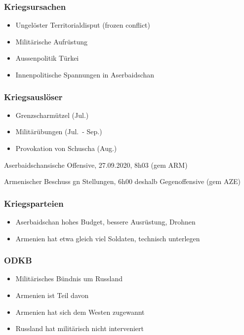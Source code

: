 {}\documentclass[a4paper]{article}
\providecommand{\tightlist}{\setlength{\itemsep}{1mm}\setlength{\parskip}{1mm}}
\begin{document}
\subsubsection{Kriegsursachen}\label{kriegsursachen}

\begin{itemize}
	\tightlist
	\item
	      Ungelöster Territorialdisput (frozen conflict)
	\item
	      Militärische Aufrüstung
	\item
	      Aussenpolitik Türkei
	\item
	      Innenpolitische Spannungen in Aserbaidschan
\end{itemize}

\subsubsection{Kriegsauslöser}\label{kriegsausluxf6ser}

\begin{itemize}
	\tightlist
	\item
	      Grenzscharmützel (Jul.)
	\item
	      Militärübungen (Jul.~- Sep.)
	\item
	      Provokation von Schuscha (Aug.)
\end{itemize}

Aserbaidschansische Offensive, 27.09.2020, 8h03 (gem ARM)

Armenischer Beschuss gn Stellungen, 6h00 deshalb Gegenoffensive (gem
AZE)

\subsubsection{Kriegsparteien}\label{kriegsparteien}

\begin{itemize}
	\tightlist
	\item
	      Aserbaidschan hohes Budget, bessere Ausrüstung, Drohnen
	\item
	      Armenien hat etwa gleich viel Soldaten, technisch unterlegen
\end{itemize}

\subsubsection{ODKB}\label{odkb}

\begin{itemize}
	\tightlist
	\item
	      Militärisches Bündnis um Russland
	\item
	      Armenien ist Teil davon
	\item
	      Armenien hat sich dem Westen zugewannt
	\item
	      Russland hat militärisch nicht interveniert
\end{itemize}
\end{document}
